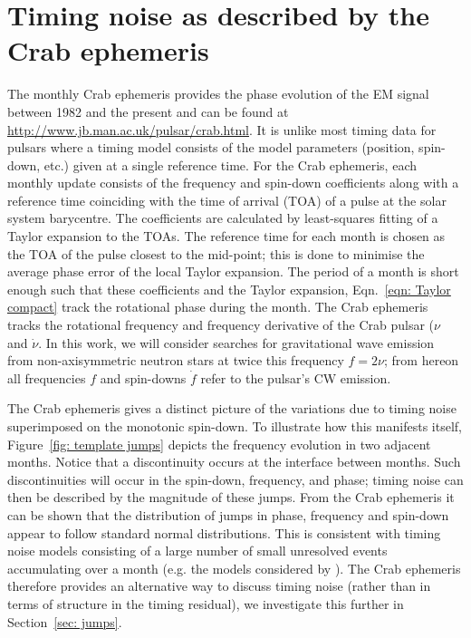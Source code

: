 \documentclass[../full_thesis/full_thesis.tex]{subfiles}
\begin{document}
\section{Timing noise as described by the Crab ephemeris}
\label{sec: timing noise as described by the crab ephemeris}
The monthly Crab ephemeris \citep{Lyne1993} provides the phase evolution of the
EM signal between 1982 and the present and can be found at
\url{http://www.jb.man.ac.uk/pulsar/crab.html}. It is unlike most timing data
for pulsars where a timing model consists of the model parameters (position,
spin-down, etc.) given at a single reference time.  For the Crab ephemeris,
each monthly update consists of the frequency and spin-down coefficients along
with a reference time coinciding with the time of arrival (TOA) of a pulse at
the solar system barycentre. The coefficients are calculated by  least-squares
fitting of a Taylor expansion to the TOAs. The reference time for each month is
chosen as the TOA of the pulse closest to the mid-point; this is done to
minimise the average phase error of the local Taylor expansion.  The period of
a month is short enough such that these coefficients and the Taylor
expansion, Eqn.~\eqref{eqn: Taylor compact} track the rotational phase during
the month. The Crab ephemeris tracks
the rotational frequency and frequency derivative of the Crab pulsar ($\nu$ and
$\dot{\nu}$. In this work, we will consider searches for gravitational
wave emission from
non-axisymmetric neutron stars at twice this frequency $f = 2\nu$; from hereon
all frequencies $f$ and spin-downs $\dot{f}$ refer to the pulsar's CW emission.

The Crab ephemeris gives a distinct picture of the variations due to timing
noise superimposed on the monotonic spin-down. To illustrate how this manifests
itself, Figure~\ref{fig: template jumps} depicts the frequency evolution in two
adjacent months. Notice that a discontinuity occurs at the interface between
months.  Such discontinuities will occur in the spin-down, frequency, and
phase; timing noise can then be described by the magnitude of these jumps.
From the Crab ephemeris it can be shown that the distribution of jumps in
phase, frequency and spin-down appear to follow standard normal distributions.
This is consistent with timing noise models consisting of a large number of
small unresolved events accumulating over a month (e.g. the models considered
by \citet{Cordes1981}). The Crab ephemeris therefore provides an alternative
way to discuss timing noise (rather than in terms of structure in the timing
residual), we investigate this further in Section~\ref{sec: jumps}.
\end{document}
